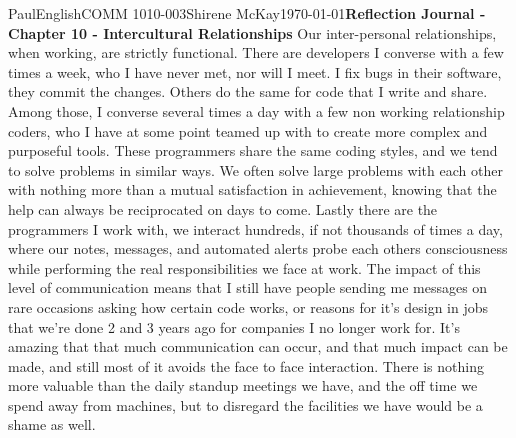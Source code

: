 \documentclass[12pt,letterpaper]{article}
\begin{document}
\begin{mla}{Paul}{English}{COMM 1010-003}{Shirene
    McKay}{\today}{\textbf{Reflection Journal - Chapter 10 - Intercultural Relationships}}
Our inter-personal relationships, when working, are strictly functional. There are developers I converse with a few times a week, who I have never met, nor will I meet. I fix bugs in their software, they commit the changes. Others do the same for code that I write and share. Among those, I converse several times a day with a few non working relationship coders, who I have at some point teamed up with to create more complex and purposeful tools. These programmers share the same coding styles, and we tend to solve problems in similar ways. We often solve large problems with each other with nothing more than a mutual satisfaction in achievement, knowing that the help can always be reciprocated on days to come. Lastly there are the programmers I work with, we interact hundreds, if not thousands of times a day, where our notes, messages, and automated alerts probe each others consciousness while performing the real responsibilities we face at work. The impact of this level of communication means that I still have people sending me messages on rare occasions asking how certain code works, or reasons for it's design in jobs that we're done 2 and 3 years ago for companies I no longer work for. It's amazing that that much communication can occur, and that much impact can be made, and still most of it avoids the face to face interaction. There is nothing more valuable than the daily standup meetings we have, and the off time we spend away from machines, but to disregard the facilities we have would be a shame as well.

\end{mla}
\end{document}
